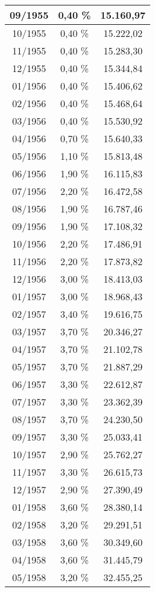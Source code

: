 \begin{center}
\begin{longtable}{|c|c|c|}
09/1955 & 0,40 \% & 15.160,97 \\ \hline
10/1955 & 0,40 \% & 15.222,02 \\ \hline
11/1955 & 0,40 \% & 15.283,30 \\ \hline
12/1955 & 0,40 \% & 15.344,84 \\ \hline
01/1956 & 0,40 \% & 15.406,62 \\ \hline
02/1956 & 0,40 \% & 15.468,64 \\ \hline
03/1956 & 0,40 \% & 15.530,92 \\ \hline
04/1956 & 0,70 \% & 15.640,33 \\ \hline
05/1956 & 1,10 \% & 15.813,48 \\ \hline
06/1956 & 1,90 \% & 16.115,83 \\ \hline
07/1956 & 2,20 \% & 16.472,58 \\ \hline
08/1956 & 1,90 \% & 16.787,46 \\ \hline
09/1956 & 1,90 \% & 17.108,32 \\ \hline
10/1956 & 2,20 \% & 17.486,91 \\ \hline
11/1956 & 2,20 \% & 17.873,82 \\ \hline
12/1956 & 3,00 \% & 18.413,03 \\ \hline
01/1957 & 3,00 \% & 18.968,43 \\ \hline
02/1957 & 3,40 \% & 19.616,75 \\ \hline
03/1957 & 3,70 \% & 20.346,27 \\ \hline
04/1957 & 3,70 \% & 21.102,78 \\ \hline
05/1957 & 3,70 \% & 21.887,29 \\ \hline
06/1957 & 3,30 \% & 22.612,87 \\ \hline
07/1957 & 3,30 \% & 23.362,39 \\ \hline
08/1957 & 3,70 \% & 24.230,50 \\ \hline
09/1957 & 3,30 \% & 25.033,41 \\ \hline
10/1957 & 2,90 \% & 25.762,27 \\ \hline
11/1957 & 3,30 \% & 26.615,73 \\ \hline
12/1957 & 2,90 \% & 27.390,49 \\ \hline
01/1958 & 3,60 \% & 28.380,14 \\ \hline
02/1958 & 3,20 \% & 29.291,51 \\ \hline
03/1958 & 3,60 \% & 30.349,60 \\ \hline
04/1958 & 3,60 \% & 31.445,79 \\ \hline
05/1958 & 3,20 \% & 32.455,25 \\ \hline

\end{longtable}
\end{center}
